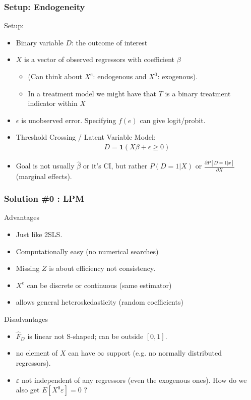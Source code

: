 \documentclass[11pt,dvipsnames,table,aspectratio=169]{beamer}
\begin{document}
\begin{frame}
\frametitle{Setup: Endogeneity}
Setup:
\begin{itemize}
\item Binary variable $D$: the outcome of interest
\item $X$ is a vector of observed regressors with coefficient $\beta$ 
\begin{itemize}
\item (Can think about $X^e$: endogenous and $X^0$: exogenous).
\item In a treatment model we might have that $T$ is a binary treatment indicator within $X$
\end{itemize}
\item $\epsilon$ is unobserved error. Specifying $f(e)$ can give logit/probit.
\item Threshold Crossing / Latent Variable Model:
\begin{eqnarray*}
D = \mathbf{1}(X \beta + \epsilon \geq 0)
\end{eqnarray*}
\item Goal is not usually $\hat{\beta}$ or it's CI, but rather $P(D=1 | X)$ or $\frac{\partial P[D=1 | x] }{\partial X}$ (marginal effects).
\end{itemize}
\end{frame}

\begin{frame}
\frametitle{Solution \#0 : LPM}
\vspace{-10pt}
\begin{block}{Advantages}
\vspace{-5pt}       
\begin{itemize}
\item Just like 2SLS.
\item Computationally easy (no numerical searches)
\item Missing $Z$ is about efficiency not consistency.
\item $X^e$ can be discrete or continuous (same estimator)
\item allows general heteroskedasticity (random coefficients)
\end{itemize}
\end{block}
\vspace{-5pt}       

\begin{block}{Disadvantages}
\vspace{-5pt}
\begin{itemize}
\item $\hat{F}_D$ is linear not S-shaped; can be outside $[0,1]$.
\item no element of $X$ can have $\infty$ support (e.g. no normally distributed regressors).
\item $\varepsilon$ not independent of any regressors  (even the exogenous ones). How do we also get $E[X^0 \varepsilon] =0$ ?
\end{itemize}
\end{block}
\end{frame}
\end{document}
